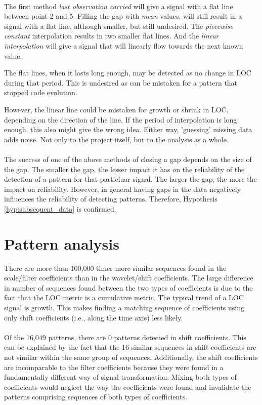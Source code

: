 \paragraph{}
The first method \emph{last observation carried }\rm will give a signal
with a flat line between point 2 and 5. Filling the gap with \emph{mean }\rm
values, will still result in a signal with a flat line, although smaller, but
still undesired. The \emph{piecewise constant }\rm interpolation results in two
smaller flat lines. And the \emph{linear interpolation }\rm will give a signal
that will linearly flow towards the next known value. 

The flat lines, when it lasts long enough, may be detected as no change in LOC
during that period. This is undesired as can be mistaken for a pattern that
stopped code evolution.

However, the linear line could be mistaken for growth or shrink in LOC,
depending on the direction of the line. If the period of interpolation is long
enough, this also might give the wrong idea. Either way, 'guessing' missing data
adds noise. Not only to the project itself, but to the analysis as a whole.

\paragraph{}
The success of one of the above methods of closing a gap depends on the size of
the gap. The smaller the gap, the lesser impact it has on the reliability of
the detection of a pattern for that particluar signal. The larger the gap, the
more the impact on reliability. However, in general having gaps in the data
negatively influences the reliability of detecting patterns. Therefore,
Hypothesis \ref{hyp:subsequent_data} is confirmed.

\section{Pattern analysis}
\label{section:pattern_evaluation}
There are more than 100,000 times more similar sequences found in the
scale/filter coefficients than in the wavelet/shift coefficients. The large
difference in number of sequences found between the two types of coefficients
is due to the fact that the LOC metric is a cumulative metric. The typical
trend of a LOC signal is growth. This makes finding a matching sequence of
coefficients using only shift coefficients (i.e., along the time axis) less
likely.

\paragraph{}
Of the 16,049 patterns, there are 0 patterns detected in shift coefficients.
This can be explained by the fact that the 16 similar sequences in shift
coefficients are not similar within the same group of sequences.
Additionally, the shift coefficients are incomparable to the filter
coefficients because they were found in a fundamentally different way of signal
transformation. Mixing both types of coefficients would neglect the way the
coefficients were found and invalidate the patterns comprising sequences of
both types of coefficients.

